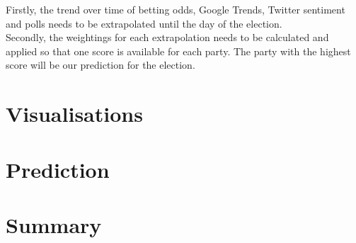 \documentclass{article}
\begin{document}
Firstly, the trend over time of betting odds, Google Trends, Twitter sentiment and polls needs to be extrapolated until the day of the election.\\

Secondly, the weightings for each extrapolation needs to be calculated and applied so that one score is available for each party. The party with the highest score will be our prediction for the election.

\section{Visualisations}


\section{Prediction}


\section{Summary}
\end{document}
